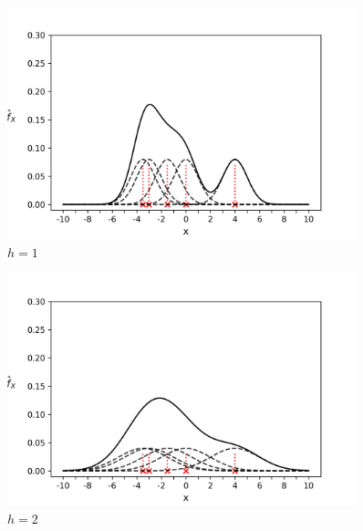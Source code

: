 \begin{figure}[H]
\includegraphics[width=0.9\textwidth]{img/h_1}
\caption{$h=1$ \cite{Fra}}
\end{figure}

\begin{figure}[H]
\includegraphics[width=0.9\textwidth]{img/h_2}
\caption{$h=2$ \cite{Fra}}
\end{figure}

